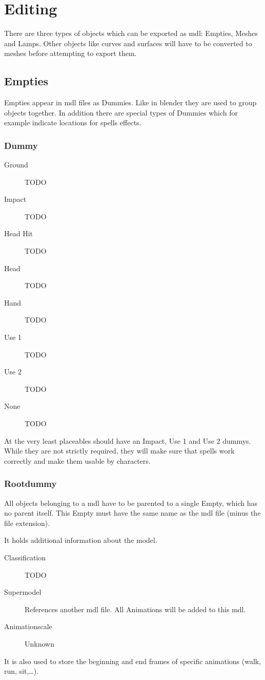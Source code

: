 \section{Editing}
There are three types of objects which can be exported as mdl: Empties,
Meshes and Lamps. Other objects like curves and surfaces will have to be
converted to meshes before attempting to export them.

\subsection{Empties}
Empties appear in mdl files as Dummies. Like in blender they are used to group
objects together. In addition there are special types of Dummies which for
example indicate locations for spells effects.

\subsubsection{Dummy}

\begin{description}
    \item[Ground] TODO
    \item[Impact] TODO
    \item[Head Hit] TODO
    \item[Head] TODO
    \item[Hand] TODO
    \item[Use 1] TODO
    \item[Use 2] TODO
    \item[None] TODO
\end{description}
At the very least placeables should have an Impact, Use 1 and Use 2 dummys.
While they are not strictly required, they will make sure that spells
work correctly and make them usable by characters.

\subsubsection{Rootdummy}
All objects belonging to a mdl have to be parented to a single Empty, which
has no parent itself. This Empty must have the same name as the mdl file
(minus the file extension).

It holds additional information about the model.
\begin{description}
    \item[Classification] TODO
    \item[Supermodel] References another mdl file. All Animations will be added to this mdl.
    \item[Animationscale] Unknown
\end{description}
It is also used to store the beginning and end frames of specific animations
(walk, run, sit,\ldots).

